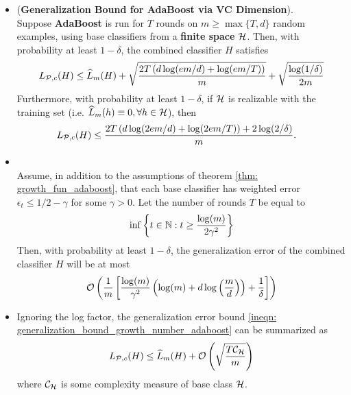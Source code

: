 \documentclass[11pt]{article}
\begin{document}
\begin{itemize}
\item \begin{theorem} \label{thm: growth_fun_adaboost}  (\textbf{Generalization Bound for AdaBoost via VC Dimension}). \citep{schapire2012boosting}\\
Suppose \textbf{AdaBoost} is run for $T$ rounds on $m \ge \max\{T, d\}$ random examples, using base classifiers from a \textbf{finite space} ${\mathcal H}$. Then, with probability at least $1 - \delta$, the combined classifier $H$ satisfies
\begin{align}
L_{{\mathcal P}, c}(H) \le \widehat{L}_{m}(H) + \sqrt{\frac{2 T\left( d\log(em/d) + \log(em/T) \right)}{m}} +\sqrt{\frac{\log(1/\delta)}{2m}} \label{ineqn: generalization_bound_growth_number_adaboost}
\end{align} Furthermore, with probability at least $1 - \delta$, if ${\mathcal H}$ is realizable with the training set (i.e. $\widehat{L}_{m}(h) \equiv 0, \forall h\in {\mathcal H}$), then
\begin{align}
L_{{\mathcal P}, c}(H) &\le \frac{2 T\left( d\log(2em/d) + \log(2em/T) \right) + 2\log(2/\delta)}{m}. \label{ineqn: pac_sample_complexity_consistency}
\end{align}
\end{theorem}



\item \begin{corollary}  \citep{schapire2012boosting}\\
Assume, in addition to the assumptions of theorem \ref{thm: growth_fun_adaboost}, that each base classifier has weighted error $\epsilon_t \le 1/2 - \gamma$ for some $\gamma > 0$. Let the number of rounds $T$ be equal to
\begin{align*}
\inf\left\{t \in {\mathbb N}: t \ge \frac{\log(m)}{2\gamma^2}\right\}
\end{align*} Then, with probability at least $1 - \delta$, the generalization error of the combined classifier $H$ will be at most
\begin{align*}
{\mathcal O}\left(\frac{1}{m}\left[\frac{\log(m)}{\gamma^2}\left(\log(m) + d\log\left(\frac{m}{d}\right)\right) + \frac{1}{\delta}\right]\right)
\end{align*}
\end{corollary}

\item \begin{remark}
Ignoring the log factor, the generalization error bound \eqref{ineqn: generalization_bound_growth_number_adaboost} can be summarized as
\begin{align*}
L_{{\mathcal P}, c}(H) \le \widehat{L}_{m}(H) + {\mathcal O}\left(\sqrt{\frac{T {\mathcal C}_{{\mathcal H}}}{m}}\right)
\end{align*} where ${\mathcal C}_{{\mathcal H}}$ is some complexity measure of base class ${\mathcal H}$.
\end{remark}


\end{itemize}
\end{document}
